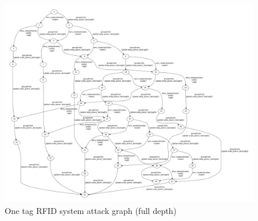 \begin{figure}
\includegraphics[width=\textwidth]{ag_dash7/sleep_ag_11}
\caption{One tag RFID system attack graph (full depth)}
\label{fig:rfid1_ag11}
\end{figure}